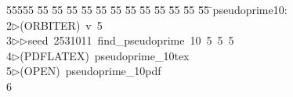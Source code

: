 %
%
\begin{tabbing}
55555 \= 55 \= 55 \= 55 \= 55 \= 55 \= 55 \= 55 \= 55 \= 55 \= 55 \= 55 \= 55 \= \>pseudoprime10:\\[0pt]
2\>$\triangleright$\>(ORBITER)\ v\ 5\ \\[0pt]
3\>$\triangleright$\>$\triangleright$\>seed\ 2531011\ find\_pseudoprime\ 10\ 5\ 5\ 5\\[0pt]
4\>$\triangleright$\>(PDFLATEX)\ pseudoprime\_10tex\\[0pt]
5\>$\triangleright$\>(OPEN)\ pseudoprime\_10pdf\\[0pt]
6\>\end{tabbing}
